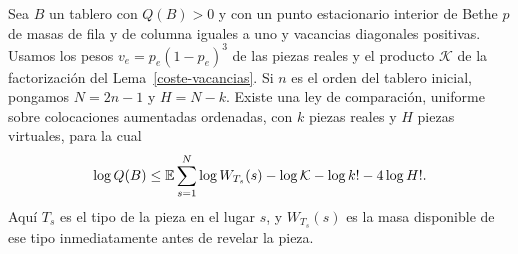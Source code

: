 \begin{lema}\label{coste-comparacion}
Sea $B$ un tablero con $Q(B)>0$ y con un punto estacionario interior de Bethe $p$ de masas de fila y
de columna iguales a uno y vacancias diagonales positivas. Usamos los pesos $v_e=p_e(1-p_e)^3$ de las
piezas reales y el producto $\mathcal K$ de la factorización del Lema~\ref{coste-vacancias}. Si $n$
es el orden del tablero inicial, pongamos $N=2n-1$ y $H=N-k$.
Existe una ley de comparación, uniforme sobre colocaciones aumentadas ordenadas, con $k$ piezas
reales y $H$ piezas
virtuales, para la cual
\[
 \log Q(B)\le
 \mathbb{E}\sum_{s=1}^N\log W_{T_s}(s)
       -\log\mathcal K-\log k!-4\log H! .
\]
Aquí $T_s$ es el tipo de la pieza en el lugar $s$, y $W_{T_s}(s)$ es la masa disponible de ese tipo
inmediatamente antes de revelar la pieza.
\end{lema}

